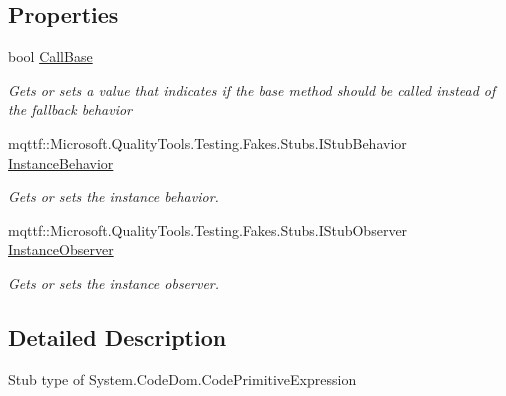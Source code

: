 \subsection*{Properties}
\begin{DoxyCompactItemize}
\item 
bool \hyperlink{class_system_1_1_code_dom_1_1_fakes_1_1_stub_code_primitive_expression_a62c565e3e15cb6aa5905fe78ad0a72a3}{Call\-Base}
\begin{DoxyCompactList}\small\item\em Gets or sets a value that indicates if the base method should be called instead of the fallback behavior\end{DoxyCompactList}\item 
mqttf\-::\-Microsoft.\-Quality\-Tools.\-Testing.\-Fakes.\-Stubs.\-I\-Stub\-Behavior \hyperlink{class_system_1_1_code_dom_1_1_fakes_1_1_stub_code_primitive_expression_a9656d5203bdff085b9db3bba00088df0}{Instance\-Behavior}
\begin{DoxyCompactList}\small\item\em Gets or sets the instance behavior.\end{DoxyCompactList}\item 
mqttf\-::\-Microsoft.\-Quality\-Tools.\-Testing.\-Fakes.\-Stubs.\-I\-Stub\-Observer \hyperlink{class_system_1_1_code_dom_1_1_fakes_1_1_stub_code_primitive_expression_a1794b6c251cbce59b4da36860410eaac}{Instance\-Observer}
\begin{DoxyCompactList}\small\item\em Gets or sets the instance observer.\end{DoxyCompactList}\end{DoxyCompactItemize}


\subsection{Detailed Description}
Stub type of System.\-Code\-Dom.\-Code\-Primitive\-Expression



